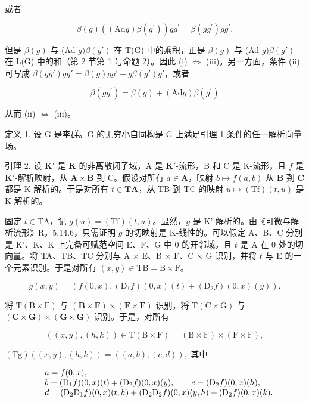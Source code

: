 或者

\[
\beta (g) ((\mathrm{Ad} g) \beta (g ^ {\prime})) g g ^ {\prime} = \beta (g g ^ {\prime}) g g ^ {\prime}.
\]

但是 \(\beta(g)\) 与 (Ad \(g)\beta(g')\) 在 T(G) 中的乘积，正是 \(\beta(g)\) 与 (Ad \(g)\beta(g')\) 在 L(G) 中的和（第 2 节第 1 号命题 2）。因此 (i) \(\Leftrightarrow\) (iii)。另一方面，条件 (ii) 可写成 \(\beta(gg')gg' = \beta(g)gg' + g\beta(g')g'\)，或者

\[
\beta (g g ^ {\prime}) = \beta (g) + (\mathrm{Ad} g) \beta (g ^ {\prime})
\]

从而 (ii) \(\Leftrightarrow\) (iii)。

定义 1. 设 G 是李群。G 的无穷小自同构是 G 上满足引理 1 条件的任一解析向量场。

引理 2. 设 \(\mathbf{K}'\) 是 \(\mathbf{K}\) 的非离散闭子域，A 是 \(\mathbf{K}'\)-流形，B 和 C 是 K-流形，且 \(f\) 是 \(\mathbf{K}'\)-解析映射，从 \(\mathbf{A} \times \mathbf{B}\) 到 C。假设对所有 \(a \in \mathbf{A}\)，映射 \(b \mapsto f(a, b)\) 从 \(\mathbf{B}\) 到 \(\mathbf{C}\) 都是 K-解析的。于是对所有 \(t \in \mathbf{TA}\)，从 TB 到 TC 的映射 \(u \mapsto (\mathrm{Tf})(t, u)\) 是 K-解析的。

固定 \(t \in \mathrm{TA}\)，记 \(g(u) = (\mathrm{Tf})(t,u)\)。显然，\(g\) 是 K'-解析的。由《可微与解析流形》R，5.14.6，只需证明 \(g\) 的切映射是 K-线性的。可以假定 A、B、C 分别是 K'、K、K 上完备可赋范空间 E、F、G 中 0 的开邻域，且 \(t\) 是 A 在 0 处的切向量。将 TA、TB、TC 分别与 A × E、B × F、C × G 识别，并将 \(t\) 与 E 的一个元素识别。于是对所有 \((x,y) \in \mathrm{TB} = \mathrm{B} \times \mathrm{F}\)。

\[
g (x, y) = \left(f (0, x), \left(\mathrm{D} _ {1} f\right) (0, x) (t) + \left(\mathrm{D} _ {2} f\right) (0, x) (y)\right).
\]

将 \(\mathrm{T(B\times F)}\) 与 \((\mathbf{B}\times \mathbf{F})\times (\mathbf{F}\times \mathbf{F})\) 识别，将 \(\mathrm{T(C\times G)}\) 与 \((\mathbf{C}\times \mathbf{G})\times (\mathbf{G}\times \mathbf{G})\) 识别。于是，对所有

\[
((x, y), (h, k)) \in \mathrm{T} (\mathrm{B} \times \mathrm{F}) = (\mathrm{B} \times \mathrm{F}) \times (\mathrm{F} \times \mathrm{F}),
\]

\((\mathrm{Tg})((x,y),(h,k)) = ((a,b),(c,d)),\) 其中

\[
\begin{array}{r l} & {a = f (0, x),} \\ & {b = (\mathrm{D} _ {1} f) (0, x) (t) + (\mathrm{D} _ {2} f) (0, x) (y), \qquad c = (\mathrm{D} _ {2} f) (0, x) (h),} \\ & {d = (\mathrm{D} _ {2} \mathrm{D} _ {1} f) (0, x) (t, h) + (\mathrm{D} _ {2} \mathrm{D} _ {2} f) (0, x) (y, h) + (\mathrm{D} _ {2} f) (0, x) (k).} \end{array}
\]

